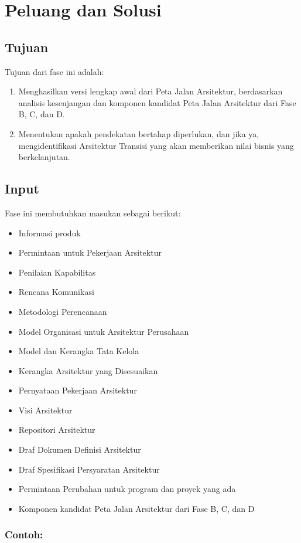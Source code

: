 \chapter{Peluang dan Solusi}

\section{Tujuan}
Tujuan dari fase ini adalah:
\begin{enumerate}
	\item Menghasilkan versi lengkap awal dari Peta Jalan Arsitektur, berdasarkan analisis kesenjangan dan komponen kandidat Peta Jalan Arsitektur dari Fase B, C, dan D.
	\item Menentukan apakah pendekatan bertahap diperlukan, dan jika ya, mengidentifikasi Arsitektur Transisi yang akan memberikan nilai bisnis yang berkelanjutan.
\end{enumerate}

\section{Input}
Fase ini membutuhkan masukan sebagai berikut:
\begin{itemize}
	\item Informasi produk
	\item Permintaan untuk Pekerjaan Arsitektur
	\item Penilaian Kapabilitas
	\item Rencana Komunikasi
	\item Metodologi Perencanaan
	\item Model Organisasi untuk Arsitektur Perusahaan
	\item Model dan Kerangka Tata Kelola
	\item Kerangka Arsitektur yang Disesuaikan
	\item Pernyataan Pekerjaan Arsitektur
	\item Visi Arsitektur
	\item Repositori Arsitektur
	\item Draf Dokumen Definisi Arsitektur
	\item Draf Spesifikasi Persyaratan Arsitektur
	\item Permintaan Perubahan untuk program dan proyek yang ada
	\item Komponen kandidat Peta Jalan Arsitektur dari Fase B, C, dan D
\end{itemize}

\subsection*{Contoh:}

